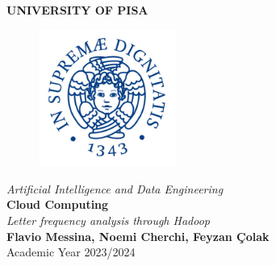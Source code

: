 \begin{titlepage}
    \centering
    \vspace*{\fill}
    {\LARGE \textbf{UNIVERSITY OF PISA}}\\[0.5cm]
    \begin{figure}[h]
        \centering
        \includegraphics[width=0.4\textwidth]{media/university-of-Pisa-logo.jpg} 
    \end{figure}
    {\Large \textit{Artificial Intelligence and Data Engineering}}\\[1.5cm]
    {\LARGE \textbf{Cloud Computing}}\\[1cm]
    {\Large \textit{Letter frequency analysis through Hadoop}}\\[8cm]
    {\large \textbf{Flavio Messina, Noemi Cherchi, Feyzan Çolak}}\\[0.5cm]
    {\large Academic Year 2023/2024}
    \vspace*{\fill}
\end{titlepage}